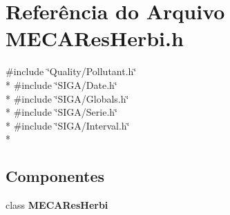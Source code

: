 \section{Referência do Arquivo M\+E\+C\+A\+Res\+Herbi.\+h}
\label{_m_e_c_a_res_herbi_8h}
{\ttfamily \#include \char`\"{}Quality/\+Pollutant.\+h\char`\"{}}\\*
{\ttfamily \#include \char`\"{}S\+I\+G\+A/\+Date.\+h\char`\"{}}\\*
{\ttfamily \#include \char`\"{}S\+I\+G\+A/\+Globals.\+h\char`\"{}}\\*
{\ttfamily \#include \char`\"{}S\+I\+G\+A/\+Serie.\+h\char`\"{}}\\*
{\ttfamily \#include \char`\"{}S\+I\+G\+A/\+Interval.\+h\char`\"{}}\\*
\subsection*{Componentes}
\begin{DoxyCompactItemize}
\item 
class {\bf M\+E\+C\+A\+Res\+Herbi}
\end{DoxyCompactItemize}
